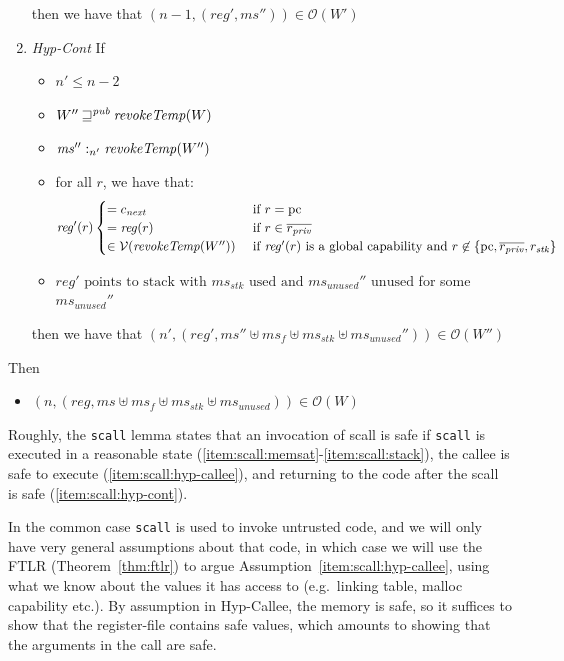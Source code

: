 \documentclass[format=acmsmall, review=true, screen=true]{acmart}
\newcommand{\var}[1]{\mathit{#1}}
\newcommand{\hs}{\var{ms}}
\newcommand{\ms}{\hs}
\newcommand{\pcreg}{\mathrm{pc}}
\newcommand{\reg}{\var{reg}}
\newcommand{\heap}{\var{mem}}
\newcommand{\stk}{\var{stk}}
\newcommand{\plainfun}[2]{
  \ifthenelse{\equal{#2}{}}
  {\mathit{#1}}
  {\mathit{#1}(#2)}
}
\newcommand{\revokeTemp}[1]{\plainfun{revokeTemp}{#1}}
\newcommand{\futurewk}{\mathbin{\sqsupseteq}^{\var{pub}}}
\newcommand{\heapSat}[3][\heap]{#1 :_{#2} #3}
\newcommand{\memSat}[3][n]{\heapSat[#2]{#1}{#3}}
\newcommand{\asmType}{\plaindom{AsmType}}
\newcommand{\plaindom}[1]{\mathrm{#1}}
\newcommand{\intr}[2]{\mathcal{#1}}
\newcommand{\valueintr}[1]{\intr{V}{#1}}
\newcommand{\stdvr}{\valueintr{\asmType}}
\newcommand{\observations}{\mathcal{O}}
\newcommand{\npair}[2][n]{\left(#1,#2 \right)}
\newenvironment{toplas}{}{}
\begin{document}
\begin{toplas}
\begin{lemma}
\begin{enumerate}
    then we have that $\npair[n-1]{(\reg',\ms'')} \in \observations(W')$
  \item \label{item:scall:hyp-cont} \emph{Hyp-Cont} If
    \begin{itemize}
    \item $n' \leq n-2$
    \item $W'' \futurewk \revokeTemp{W}$
    \item $\memSat[n']{\ms''}{\revokeTemp{W''}}$ 
    \item for all $r$, we have that:
      \begin{equation*}
        \reg'(r)
        \begin{cases}
          = c_{\mathit{next}} &\text{ if } r = \pcreg\\
          = \reg(r)&\text{ if } r \in \overline{r_{\mathit{priv}}}\\
          \in \stdvr(\revokeTemp{W''}) &\text{ if $\reg'(r)$ is a global capability and } r \not\in \{\pcreg,\overline{r_{\mathit{priv}}}, r_\stk\}
        \end{cases}
      \end{equation*}
    \item $\reg' \text{ points to stack with $\ms_\stk$ used and $\ms_{\mathit{unused}}''$ unused}$ for some $\ms_{\mathit{unused}}''$
    \end{itemize}

    then we have that $\npair[n']{(\reg',\ms'' \uplus \ms_f \uplus \ms_\stk \uplus \ms_{\var{unused}}'')} \in \observations(W'')$
  \end{enumerate}
  Then 
  \begin{itemize}
    \item $\npair{(\reg,\ms \uplus \ms_f \uplus \ms_\stk \uplus \ms_{\var{unused}})} \in \observations(W)$
  \end{itemize}

\end{lemma}
Roughly, the \texttt{scall} lemma states that an invocation of scall is safe if
\texttt{scall} is executed in a reasonable state
(\ref{item:scall:memsat}-\ref{item:scall:stack}), the callee is safe to execute
(\ref{item:scall:hyp-callee}), and returning to the code after the scall is safe
(\ref{item:scall:hyp-cont}).

In the common case \texttt{scall} is used to invoke untrusted code, and we will
only have very general assumptions about that code, in which case we will use
the FTLR (Theorem~\ref{thm:ftlr}) to argue
Assumption~\ref{item:scall:hyp-callee}, using what we know about the values it
has access to (e.g.\ linking table, malloc capability etc.). By assumption in
Hyp-Callee, the memory is safe, so it suffices to show that the register-file
contains safe values, which amounts to showing that the arguments in the call
are safe.


\end{toplas}
\end{document}
